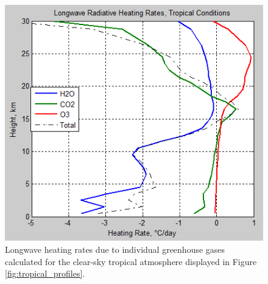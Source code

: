 \documentclass[12pt]{book}
\begin{document}
\begin{figure}
\begin{center}
\includegraphics[width=8 cm]{../external_figures/atmospheric-radiation-13c-heating-rates-tropical-each-h2o-co2-o3.png}
\end{center}
\caption{ Longwave heating rates due to individual greenhouse gases calculated for the  clear-sky tropical atmosphere displayed in Figure \ref{fig:tropical_profiles}.  } 
\label{fig:radiative_cooling}
\end{figure}


\end{document}
